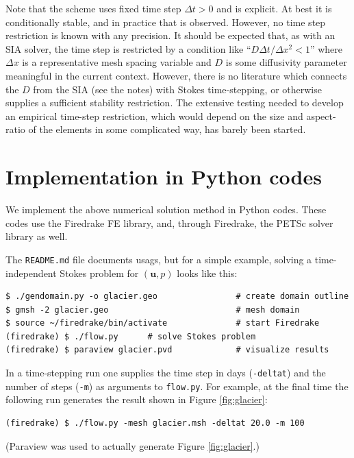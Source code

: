 \documentclass[letterpaper,final,12pt,reqno]{amsart}
\newcommand{\bu}{\mathbf{u}}
\begin{document}
Note that the scheme uses fixed time step $\Delta t > 0$ and is explicit.  At best it is conditionally stable, and in practice that is observed.  However, no time step restriction is known with any precision.  It should be expected that, as with an SIA solver, the time step is restricted by a condition like ``$D\Delta t / \Delta x^2 < 1$'' where $\Delta x$ is a representative mesh spacing variable and $D$ is some diffusivity parameter meaningful in the current context.  However, there is no literature which connects the $D$ from the SIA (see the notes) with Stokes time-stepping, or otherwise supplies a sufficient stability restriction.  The extensive testing needed to develop an empirical time-step restriction, which would depend on the size and aspect-ratio of the elements in some complicated way, has barely been started.


\section{Implementation in Python codes} \label{sec:implementation}

We implement the above numerical solution method in Python codes.  These codes use the Firedrake FE library, and, through Firedrake, the PETSc solver library \cite{Balayetal2018,BuelerBook} as well.

The \verb|README.md| file documents usags, but for a simple example, solving a time-independent Stokes problem for $(\bu,p)$ looks like this:

\medskip
\begin{Verbatim}
$ ./gendomain.py -o glacier.geo                # create domain outline
$ gmsh -2 glacier.geo                          # mesh domain
$ source ~/firedrake/bin/activate              # start Firedrake
(firedrake) $ ./flow.py      # solve Stokes problem
(firedrake) $ paraview glacier.pvd             # visualize results
\end{Verbatim}

\medskip
\noindent In a time-stepping run one supplies the time step in days (\texttt{-deltat}) and the number of steps (\texttt{-m}) as arguments to \texttt{flow.py}.  For example, at the final time the following run generates the result shown in Figure \ref{fig:glacier}:

\medskip
\begin{Verbatim}
(firedrake) $ ./flow.py -mesh glacier.msh -deltat 20.0 -m 100
\end{Verbatim}

\medskip
\noindent (Paraview was used to actually generate Figure \ref{fig:glacier}.)
\end{document}
